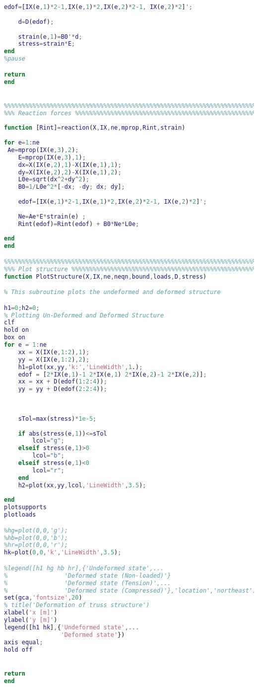 \begin{lstlisting}[language=Matlab, caption = FE implementation for Linear truss analysis, label=lst:CodeLinear]
    edof=[IX(e,1)*2-1,IX(e,1)*2,IX(e,2)*2-1, IX(e,2)*2]';
    
    d=D(edof);
    
    strain(e,1)=B0'*d;
    stress=strain*E;
end
%pause

return
end


%%%%%%%%%%%%%%%%%%%%%%%%%%%%%%%%%%%%%%%%%%%%%%%%%%%%%%%%%%%%%%%%%%%%%%%%%%%
%%% Reaction forces %%%%%%%%%%%%%%%%%%%%%%%%%%%%%%%%%%%%%%%%%%%%%%%%%%%%%%%                                                        
                                                        
function [Rint]=reaction(X,IX,ne,mprop,Rint,strain)                                                        
                                                        
for e=1:ne
 Ae=mprop(IX(e,3),2);
    E=mprop(IX(e,3),1);
    dx=X(IX(e,2),1)-X(IX(e,1),1);
    dy=X(IX(e,2),2)-X(IX(e,1),2);
    L0e=sqrt(dx^2+dy^2);
    B0=1/L0e^2*[-dx; -dy; dx; dy];
    
    edof=[IX(e,1)*2-1,IX(e,1)*2,IX(e,2)*2-1, IX(e,2)*2]';
        
    Ne=Ae*E*strain(e) ;
    Rint(edof)=Rint(edof) + B0*Ne*L0e;
    
end
end

%%%%%%%%%%%%%%%%%%%%%%%%%%%%%%%%%%%%%%%%%%%%%%%%%%%%%%%%%%%%%%%%%%%%%%%%%%%
%%% Plot structure %%%%%%%%%%%%%%%%%%%%%%%%%%%%%%%%%%%%%%%%%%%%%%%%%%%%%%%%
function PlotStructure(X,IX,ne,neqn,bound,loads,D,stress)

% This subroutine plots the undeformed and deformed structure

h1=0;h2=0;
% Plotting Un-Deformed and Deformed Structure
clf
hold on
box on
for e = 1:ne
    xx = X(IX(e,1:2),1);
    yy = X(IX(e,1:2),2);
    h1=plot(xx,yy,'k:','LineWidth',1.);
    edof = [2*IX(e,1)-1 2*IX(e,1) 2*IX(e,2)-1 2*IX(e,2)];
    xx = xx + D(edof(1:2:4));
    yy = yy + D(edof(2:2:4));
    
        
    
    sTol=max(stress)*1e-5;
    
    if abs(stress(e,1))<=sTol
        lcol="g";
    elseif stress(e,1)>0
        lcol="b";
    elseif stress(e,1)<0
        lcol="r";
    end
    h2=plot(xx,yy,lcol,'LineWidth',3.5);
    
end
plotsupports
plotloads

%hg=plot(0,0,'g');
%hb=plot(0,0,'b');
%hr=plot(0,0,'r');
hk=plot(0,0,'k','LineWidth',3.5);

%legend([h1 hg hb hr],{'Undeformed state',...
%                'Deformed state (Non-loaded)'}
%                'Deformed state (Tension)',...
%                'Deformed state (Compressed)'},'location','northeast')
set(gca,'fontsize',20)
% title('Deformation of truss structure')
xlabel('x [m]')
ylabel('y [m]')
legend([h1 hk],{'Undeformed state',...
                'Deformed state'})
axis equal;
hold off


return
end

\end{lstlisting}

